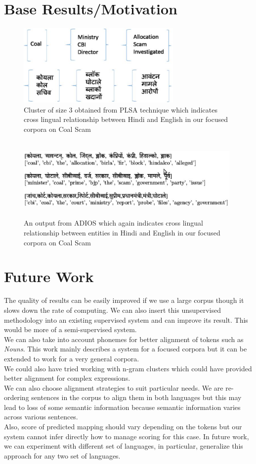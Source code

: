 \documentclass{article}
\begin{document}
\section{Base Results/Motivation}
\begin{figure}[h!tb]
\centering
\includegraphics[width=8cm,height=4cm]{2.eps}
\caption {Cluster of size 3 obtained from PLSA technique which indicates cross lingual relationship between Hindi and English in our focused corpora on Coal Scam}
\end{figure}
\begin{figure}[h!tb]
\centering
\includegraphics[width=11cm,height=4cm]{3.eps}
\caption {An output from ADIOS which again indicates cross lingual relationship between entities in Hindi and English in our focused corpora on Coal Scam}
\end{figure}

\newpage
\section{Future Work}
The quality of results can be easily improved if we use a large corpus though it slows down the rate of computing. We can also insert this unsupervised methodology into an existing supervised system and can improve its result. This would be more of a semi-supervised system.\\
We can also take into account phonemes for better alignment of tokens such as \emph{Nouns}. This work mainly describes a system for a focused corpora but it can be extended to work for a very general corpora.\\
We could also have tried working with n-gram clusters which could have provided better alignment for complex expressions.\\
We can also choose alignment strategies to suit particular needs.
We are re-ordering sentences in the corpus to align them in both languages but this may lead to loss of some semantic information because semantic information varies across various sentences.\\
Also, score of predicted mapping should vary depending on the tokens but our system cannot infer directly how to manage scoring for this case.
In future work, we can experiment with different set of languages, in particular, generalize this approach for any two set of languages.
\end{document}

